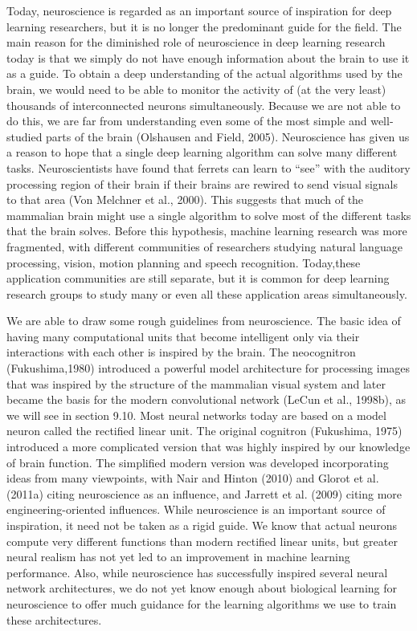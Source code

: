 \documentclass[11pt]{article}
\begin{document}
Today, neuroscience is regarded as an important source of inspiration for deep learning researchers, but it is no longer the predominant guide for the field.
The main reason for the diminished role of neuroscience in deep learning research today is that we simply do not have enough information about the brain to use it as a guide.
To obtain a deep understanding of the actual algorithms used by the brain, we would need to be able to monitor the activity of (at the very least) thousands of interconnected neurons simultaneously.
Because we are not able to do this, we are far from understanding even some of the most simple and well-studied parts of the brain (Olshausen and Field, 2005).
Neuroscience has given us a reason to hope that a single deep learning algorithm can solve many different tasks.
Neuroscientists have found that ferrets can learn to “see” with the auditory processing region of their brain if their brains are rewired to send visual signals to that area (Von Melchner et al., 2000).
This suggests that much of the mammalian brain might use a single algorithm to solve most of the different tasks that the brain solves.
Before this hypothesis, machine learning research was more fragmented, with different communities of researchers studying natural language processing, vision, motion planning and speech recognition.
Today,these application communities are still separate, but it is common for deep learning research groups to study many or even all these application areas simultaneously.

We are able to draw some rough guidelines from neuroscience.
The basic idea of having many computational units that become intelligent only via their interactions with each other is inspired by the brain.
The neocognitron (Fukushima,1980) introduced a powerful model architecture for processing images that was inspired by the structure of the mammalian visual system and later became the basis for the modern convolutional network (LeCun et al., 1998b), as we will see in section 9.10.
Most neural networks today are based on a model neuron called the rectified linear unit.
The original cognitron (Fukushima, 1975) introduced a more complicated version that was highly inspired by our knowledge of brain function.
The simplified modern version was developed incorporating ideas from many viewpoints, with Nair and Hinton (2010) and Glorot et al. (2011a) citing neuroscience as an inﬂuence, and Jarrett et al. (2009) citing more engineering-oriented influences.
While neuroscience is an important source of inspiration, it need not be taken as a rigid guide.
We know that actual neurons compute very different functions than modern rectified linear units, but greater neural realism has not yet led to an improvement in machine learning performance.
Also, while neuroscience has successfully inspired several neural network architectures, we do not yet know enough about biological learning for neuroscience to offer much guidance for the learning algorithms we use to train these architectures.
\end{document}
